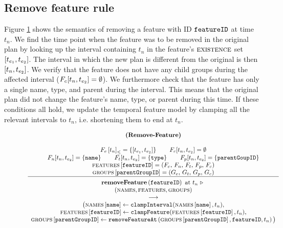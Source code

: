 \subsection{Remove feature rule}
Figure \ref{rule:remove-feature} shows the semantics of removing a feature with ID $\texttt{featureID}$ at time $t_n$. We find the time point when the feature was to be removed in the original plan by looking up the interval containing $t_n$ in the feature's $\textsc{existence}$ set $\interval{t_{e_1}}{t_{e_2}}$. The interval in which the new plan is different from the original is then $\interval{t_n}{t_{e_2}}$. We verify that the feature does not have any child groups during the affected interval ($F_c \interval{t_{n}}{t_{e_2}} = \emptyset$). We furthermore check that the feature has only a single name, type, and parent during the interval. This means that the original plan did not change the feature's name, type, or parent during this time. If these conditions all hold, we update the temporal feature model by clamping all the relevant intervals to $t_n$, i.e. shortening them to end at $t_n$. 

\begin{figure}
    \renewcommand{\arraystretch}{1.1}
    \sossize$$\begin{array}{c}
      \ntyperule{Remove-Feature}
      {\\
        \containing{F_e}{t_n} = \set{\interval{t_{e_1}}{t_{e_2}}} \qquad
        F_c \interval{t_{n}}{t_{e_2}} = \emptyset \\
        F_n \interval{t_n}{t_{e_2}} = \set{\var{name}} \qquad
        F_t \interval{t_n}{t_{e_2}} = \set{\var{type}} \qquad
        F_p \interval{t_n}{t_{e_2}} = \set{\var{parentGoupID}} \\
        \lookup{\features{}}{\var{featureID}} = \left( F_e,\, F_n,\, F_t,\, F_p,\, F_c \right) \\
        \lookup{\groups{}}{\var{parentGroupID}} = \left( G_e,\, G_t,\, G_p,\, G_c \right)
      }
      {
        \textbf{removeFeature}\left( \var{featureID}\right) \text{ at } t_n \shove \\
        (\names{}, \features{}, \groups{}) \\
        \transition \\
        \big(\lookup{\names{}}{\var{name}} \assign \var{clampInterval}(\lookup{\names{}}{\var{name}}, t_n),\\
        \lookup{\features{}}{\var{featureID}} \assign \var{clampFeature}(\lookup{\features{}}{\var{featureID}}, t_n) ,\\
      \lookup{\groups{}}{\var{parentGroupID}} \assign \var{removeFeatureAt}\left(\lookup{\groups}{\var{parentGroupID}}, \var{featureID}, t_n\right)\big)
      }
    \end{array}$$
  \caption{\label{rule:remove-feature}}
\end{figure}

